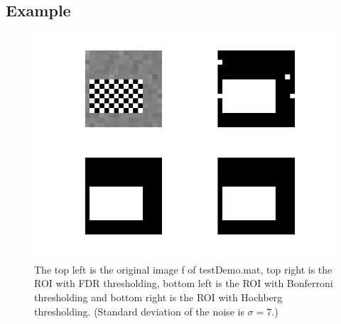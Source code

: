 \documentclass[a4paper,12pt]{article}
\theoremstyle{plain}
\theoremstyle{definition}
\theoremstyle{remark}
\begin{document}
\subsection{Example}
\begin{figure}[h]
	\includegraphics[width=\linewidth]{Thresholding_Comparison}
	\caption[Comparison of different thresholding procedures]{The top left is the original image f of testDemo.mat, top right is the ROI with FDR thresholding, bottom left is the ROI with Bonferroni thresholding and bottom right is the ROI with Hochberg thresholding. (Standard deviation of the noise is $\sigma = 7$.)}
	\label{fig:demo1comparison}
\end{figure}
\end{document}
